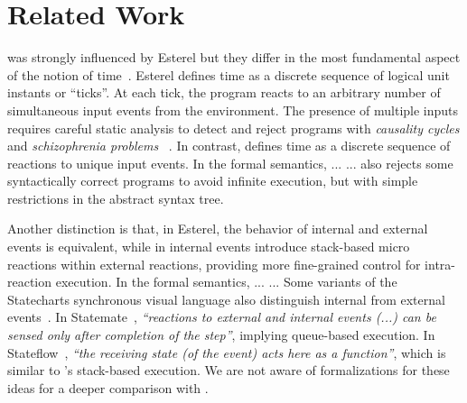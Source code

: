 \section{Related Work}

\CEU was strongly influenced by Esterel but they differ in the most fundamental 
aspect of the notion of time~\cite{ceu.sensys13}.
%
Esterel defines time as a discrete sequence of logical unit instants or 
``ticks''.
At each tick, the program reacts to an arbitrary number of simultaneous input 
events from the environment.
%
The presence of multiple inputs requires careful static analysis to detect and
reject programs with \emph{causality cycles} and \emph{schizophrenia problems}%
~\cite{esterel.constructive,esterel.d7,esterel.d6,esterel.d3,esterel.d5,esterel.d8,esterel.d1,esterel.schizo2}.
%
In contrast, \CEU defines time as a discrete sequence of reactions to
unique input events.
%
In the formal semantics, ...  ...
\CEU also rejects some syntactically correct programs to avoid infinite
execution, but with simple restrictions in the abstract syntax tree.

Another distinction is that, in Esterel, the behavior of internal and external
events is equivalent, while in \CEU internal events introduce stack-based micro
reactions within external reactions, providing more fine-grained control for
intra-reaction execution.
%
In the formal semantics, ...  ...
%
Some variants of the Statecharts synchronous visual language also distinguish
internal from external events~\cite{statecharts.variants}.
In Statemate~\cite{statecharts.statemate}, \emph{``reactions to external and
internal events (...) can be sensed only after completion of the step''},
implying queue-based execution.
In Stateflow~\cite{statecharts.stateflow}, \emph{``the receiving state (of the
event) acts here as a function''}, which is similar to \CEU's
stack-based execution.
We are not aware of formalizations for these ideas for a deeper comparison with
\CEU.


